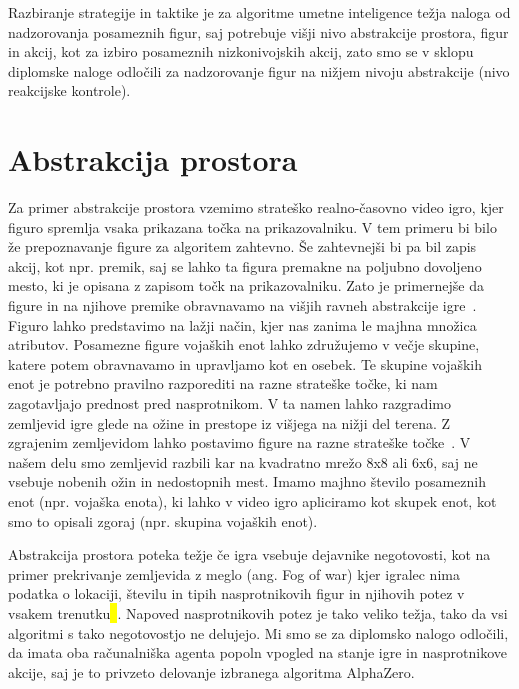 \documentclass[a4paper, 12pt]{book}
\begin{document}
Razbiranje strategije in taktike je za algoritme umetne inteligence težja naloga od nadzorovanja posameznih figur, saj potrebuje višji nivo abstrakcije prostora, figur in akcij, kot za izbiro posameznih nizkonivojskih akcij, zato smo se v sklopu diplomske naloge odločili za nadzorovanje figur na nižjem nivoju abstrakcije (nivo reakcijske kontrole).

\section{Abstrakcija prostora}
Za primer abstrakcije prostora vzemimo strateško realno-časovno  video igro, kjer figuro spremlja vsaka prikazana točka na prikazovalniku.
V tem primeru bi bilo že prepoznavanje figure za algoritem zahtevno. 
Še zahtevnejši bi pa bil zapis akcij, kot npr. premik, saj se lahko ta figura premakne na poljubno dovoljeno mesto, ki je opisana z zapisom točk na prikazovalniku.
Zato je primernejše da figure in na njihove premike obravnavamo na višjih ravneh abstrakcije igre~\cite{uriarte2015automatic}.
Figuro lahko predstavimo na lažji način, kjer nas zanima le majhna množica atributov.
Posamezne figure vojaških enot lahko združujemo v večje skupine, katere potem obravnavamo in upravljamo kot en osebek.
Te skupine vojaških enot je potrebno pravilno razporediti na razne strateške točke, ki nam zagotavljajo prednost pred nasprotnikom.
V ta namen lahko razgradimo zemljevid igre glede na ožine in prestope iz višjega na nižji del terena.
Z zgrajenim zemljevidom lahko postavimo figure na razne strateške točke~\cite{uriarte2014game}.
V našem delu smo zemljevid razbili kar na kvadratno mrežo 8x8 ali 6x6, saj ne vsebuje nobenih ožin in nedostopnih mest.
Imamo majhno število posameznih enot (npr. vojaška enota), ki lahko v video igro apliciramo kot skupek enot, kot smo to opisali zgoraj (npr. skupina vojaških enot).

Abstrakcija prostora poteka težje če igra vsebuje dejavnike negotovosti, kot na primer prekrivanje zemljevida z meglo (ang. Fog of war) kjer igralec nima podatka o lokaciji, številu in tipih nasprotnikovih figur in njihovih potez v vsakem trenutku\hl{~{\cite{ciancarini2010monte}}}. 
Napoved nasprotnikovih potez je tako veliko težja, tako da vsi algoritmi s tako negotovostjo ne delujejo.
Mi smo se za diplomsko nalogo odločili, da imata oba računalniška agenta popoln vpogled na stanje igre in nasprotnikove akcije, saj je to privzeto delovanje izbranega algoritma AlphaZero.
\end{document}

